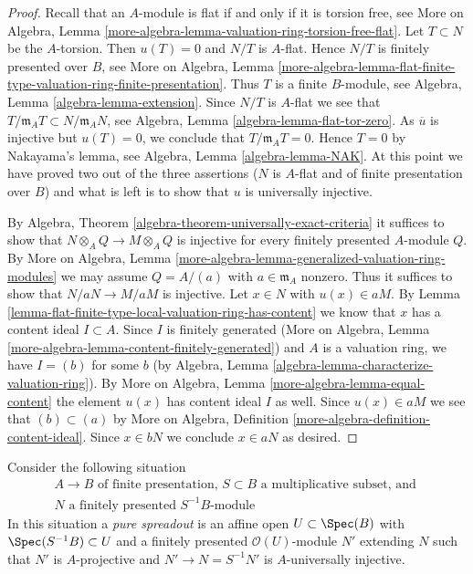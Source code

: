 \begin{proof}
Recall that an $A$-module is flat if and only if it is torsion free, see
More on Algebra, Lemma
\ref{more-algebra-lemma-valuation-ring-torsion-free-flat}.
Let $T \subset N$ be the $A$-torsion. Then $u(T) = 0$ and 
$N/T$ is $A$-flat. Hence $N/T$ is finitely presented over $B$, see
More on Algebra, Lemma
\ref{more-algebra-lemma-flat-finite-type-valuation-ring-finite-presentation}.
Thus $T$ is a finite $B$-module, see
Algebra, Lemma \ref{algebra-lemma-extension}.
Since $N/T$ is $A$-flat we see that
$T/\mathfrak m_A T \subset N/\mathfrak m_A N$, see
Algebra, Lemma \ref{algebra-lemma-flat-tor-zero}.
As $\overline{u}$ is injective but $u(T) = 0$, we conclude that
$T/\mathfrak m_A T = 0$. Hence $T = 0$ by Nakayama's lemma, see
Algebra, Lemma \ref{algebra-lemma-NAK}. At this point we have
proved two out of the three assertions ($N$ is $A$-flat and
of finite presentation over $B$) and what is left is to show that
$u$ is universally injective.

\medskip\noindent
By Algebra, Theorem \ref{algebra-theorem-universally-exact-criteria}
it suffices to show that $N \otimes_A Q \to M \otimes_A Q$ is injective
for every finitely presented $A$-module $Q$. By
More on Algebra, Lemma
\ref{more-algebra-lemma-generalized-valuation-ring-modules}
we may assume $Q = A/(a)$ with $a \in \mathfrak m_A$ nonzero.
Thus it suffices to show that $N/aN \to M/aM$ is injective.
Let $x \in N$ with $u(x) \in aM$. By
Lemma \ref{lemma-flat-finite-type-local-valuation-ring-has-content}
we know that $x$ has a content ideal $I \subset A$. Since
$I$ is finitely generated
(More on Algebra, Lemma \ref{more-algebra-lemma-content-finitely-generated})
and $A$ is a valuation ring, we have $I = (b)$ for some $b$
(by Algebra, Lemma \ref{algebra-lemma-characterize-valuation-ring}).
By More on Algebra, Lemma \ref{more-algebra-lemma-equal-content}
the element $u(x)$ has content ideal $I$ as well.
Since $u(x) \in aM$ we see that $(b) \subset (a)$
by More on Algebra, Definition \ref{more-algebra-definition-content-ideal}.
Since $x \in bN$ we conclude $x \in aN$ as desired.
\end{proof}

\noindent
Consider the following situation
\begin{equation}
\label{equation-star}
\begin{matrix}
A \to B\text{ of finite presentation, }S \subset B
\text{ a multiplicative subset, and }\\
N\text{ a finitely presented }S^{-1}B\text{-module}
\end{matrix}
\end{equation}
In this situation a {\it pure spreadout} is an affine open
$U \subset \Spec(B)$ with $\Spec(S^{-1}B) \subset U$ and a
finitely presented $\mathcal{O}(U)$-module $N'$ extending $N$
such that $N'$ is $A$-projective and $N' \to N = S^{-1}N'$
is $A$-universally injective.

